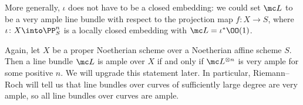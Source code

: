 \documentclass[../notes.tex]{subfiles}
\begin{document}
\begin{remark}
	More generally, $\iota$ does not have to be a closed embedding: we could set $\mc L$ to be a very ample line bundle with respect to the projection map $f\colon X\to S$, where $\iota\colon X\into\PP^n_S$ is a locally closed embedding with $\mc L=\iota^*\OO(1)$.
\end{remark}
\begin{remark}
	Again, let $X$ be a proper Noetherian scheme over a Noetherian affine scheme $S$. Then a line bundle $\mc L$ is ample over $X$ if and only if $\mc L^{\otimes n}$ is very ample for some positive $n$. We will upgrade this statement later. In particular, Riemann--Roch will tell us that line bundles over curves of sufficiently large degree are very ample, so all line bundles over curves are ample.
\end{remark}
\end{document}

